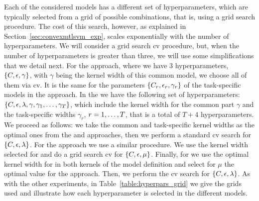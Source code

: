 Each of the considered models has a different set of hyperparameters, which are typically selected from a grid of possible combinations, that is, using a grid search procedure. The cost of this search, however, as explained in Section~\ref{sec:convexmtlsvm_exp}, scales exponentially with the number of hyperparameters.
%
We will consider a grid search \acrshort{cv} procedure, but, when the number of hyperparameters is greater than three, we will use some simplifications that we detail next.
%
For the  approach, where we have \num{3} hyperparameters, $\left\{C, \epsilon, \gamma\right\}$, with $\gamma$ being the kernel width of this common model, we choose all of them via \acrshort{cv}. 
It is the same for the parameters $\left\{C_r, \epsilon_r, \gamma_r\right\}$ of the task-specific models in the  approach.
%
In the  we have the following set of hyperparameters: $\left\{C, \epsilon, \lambda, \gamma, \gamma_1, \ldots, \gamma_T\right\}$, which include the kernel width for the common part $\gamma$ and the task-specific widths $\gamma_r$, $r=1, \ldots, T$, that is a total of $T + 4$ hyperparameters. We proceed as follows: we take the common and task-specific kernel widths as the optimal ones from the  and  approaches, then we perform a standard \acrshort{cv} search for $\left\{C, \epsilon, \lambda\right\}$.
%
For the  approach we use a similar procedure. We use the kernel width selected for  and do a grid search \acrshort{cv} for $\left\{C, \epsilon, \mu\right\}$.
%
Finally, for  we use the optimal kernel width for  in both kernels of the model definition and select for $\mu$ the optimal value for the  approach. Then, we perform the \acrshort{cv} search for $\left\{C, \epsilon, \lambda\right\}$.
%
As with the other experiments, in Table~\ref{table:hyperpars_grid} we give the grids used and illustrate how each hyperparameter is selected in the different models.

